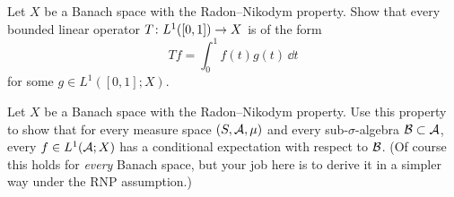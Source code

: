 \begin{exercise}
  Let $X$ be a Banach space with the Radon--Nikodym property.
  Show that every bounded linear operator $T \colon L^1([0,1]) \rightarrow X$ is of the form
  \begin{equation*}
    Tf = \int_0^1 f(t) g(t) \, \dd t
  \end{equation*}
  for some $g \in L^1([0,1];X)$.
\end{exercise}

\begin{exercise}
  Let $X$ be a Banach space with the Radon--Nikodym property.
  Use this property to show that for every measure space $(S,\mathcal{A},\mu)$ and every sub-$\sigma$-algebra $\mathcal{B} \subset \mathcal{A}$, every $f \in L^1(\mathcal{A};X)$ has a conditional expectation with respect to $\mathcal{B}$.
  (Of course this holds for \emph{every} Banach space, but your job here is to derive it in a simpler way under the RNP assumption.)
\end{exercise}


